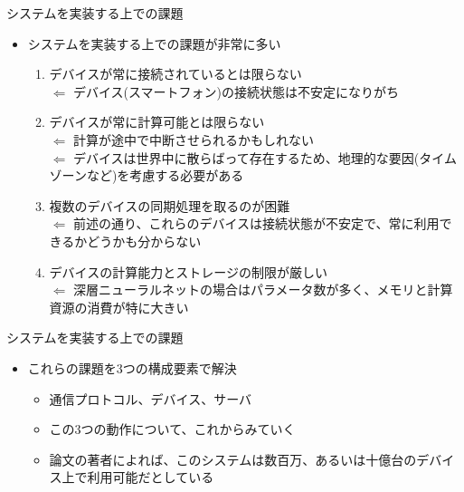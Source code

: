 \documentclass[dvipdfmx,notheorems,t]{beamer}
\begin{document}
\begin{frame}{システムを実装する上での課題}

\begin{itemize}
	\item システムを実装する上での課題が非常に多い
	\begin{enumerate}
		\item デバイスが常に接続されているとは限らない \\
		$\Leftarrow$ デバイス(スマートフォン)の接続状態は不安定になりがち
		\newline
		
		\item デバイスが常に計算可能とは限らない \\
		$\Leftarrow$ 計算が途中で中断させられるかもしれない \\
		$\Leftarrow$ デバイスは世界中に散らばって存在するため、地理的な要因(タイムゾーンなど)を考慮する必要がある
		\newline
		
		\item 複数のデバイスの同期処理を取るのが困難 \\
		$\Leftarrow$ 前述の通り、これらのデバイスは接続状態が不安定で、常に利用できるかどうかも分からない
		\newline
		
		\item デバイスの計算能力とストレージの制限が厳しい \\
		$\Leftarrow$ 深層ニューラルネットの場合はパラメータ数が多く、メモリと計算資源の消費が特に大きい
	\end{enumerate}
\end{itemize}

\end{frame}

\begin{frame}{システムを実装する上での課題}

\begin{itemize}
	\item これらの課題を3つの構成要素で解決
	\begin{itemize}
		\item \alert{通信プロトコル}、\alert{デバイス}、\alert{サーバ}
		\item この3つの動作について、これからみていく
		\newline
		
		\item 論文の著者によれば、このシステムは数百万、あるいは十億台のデバイス上で利用可能だとしている
	\end{itemize}
\end{itemize}

\end{frame}
\end{document}
